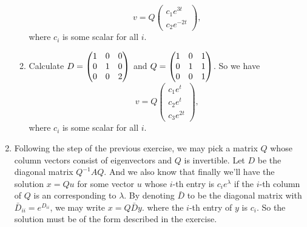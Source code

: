 \begin{enumerate}
\begin{enumerate}
\[v=Q\begin{pmatrix}c_1e^{3t}\\c_2e^{-2t}\end{pmatrix},\]
where $c_i$ is some scalar for all $i$.
\item Calculate $D=\begin{pmatrix}1 & 0 & 0\cr 0 & 1 & 0\cr 0 & 0 & 2\end{pmatrix}$ and $Q=\begin{pmatrix}1 & 0 & 1\cr 0 & 1 & 1\cr 0 & 0 & 1\end{pmatrix}$. So we have 
\[v=Q\begin{pmatrix}c_1e^{t}\\c_2e^{t}\\c_3e^{2t}\end{pmatrix},\]
where $c_i$ is some scalar for all $i$.
\end{enumerate}
\item Following the step of the previous exercise, we may pick a matrix $Q$ whose column vectors consist of eigenvectors and $Q$ is invertible. Let $D$ be the diagonal matrix $Q^{-1}AQ$. And we also know that finally we'll have the solution $x=Qu$ for some vector $u$ whose $i$-th entry is $c_ie^{\lambda}$ if the $i$-th column of $Q$ is an \egve{} corresponding to $\lambda$. By denoting  $\bar{D}$ to be the diagonal matrix with $\bar{D}_{ii}=e^{D_{ii}}$, we may write $x=Q\bar{D}y$. where the $i$-th entry of $y$ is $c_i$. So the solution must be of the form described in the exercise. 


\end{enumerate}
